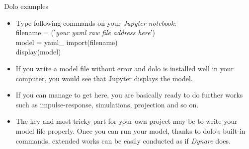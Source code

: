 \documentclass{beamer}
\begin{document}
\begin{frame}{Dolo examples}
\begin{itemize}
  
    \item Type following commands on your \textit{Jupyter notebook}:\\
    
    filename = ('\textit{your yaml raw file address here}')\\
    model = yaml\_ import(filename)\\
    display(model)  

\item If you write a model file without error and dolo is installed well in your computer, you would see that Jupyter displays the model. 
\item If you can manage to get here, you are basically ready to do further works such as impulse-response, simulations, projection and so on.
\item The key and most tricky part for your own project may be to write your model file properly. Once you can run your model, thanks to dolo's built-in commands, extended works can be easily conducted as if \textit{Dynare} does. 
\end{itemize}
\end{frame}
\end{document}

